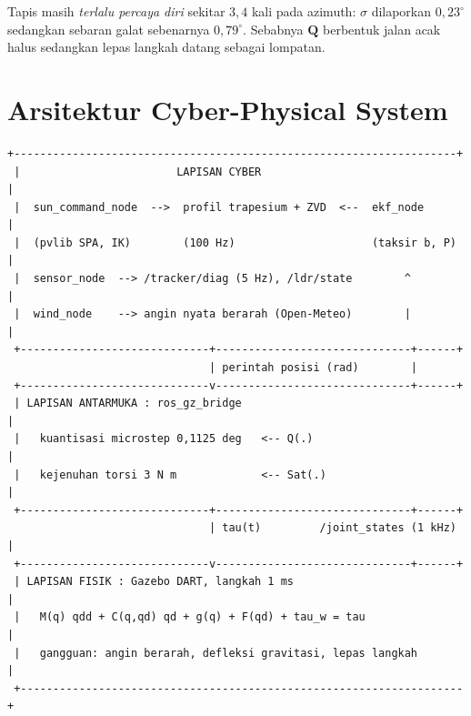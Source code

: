 \documentclass[11pt,a4paper]{article}
\newcommand{\degg}{^\circ}
\begin{document}
Tapis masih \emph{terlalu percaya diri} sekitar $3{,}4$ kali pada azimuth: $\sigma$ dilaporkan $0{,}23\degg$
sedangkan sebaran galat sebenarnya $0{,}79\degg$. Sebabnya $\bm{Q}$ berbentuk jalan acak halus sedangkan
lepas langkah datang sebagai lompatan.

\section{Arsitektur Cyber-Physical System}

\begin{Verbatim}[fontsize=\small,frame=single]
 +--------------------------------------------------------------------+
 |                        LAPISAN CYBER                               |
 |  sun_command_node  -->  profil trapesium + ZVD  <--  ekf_node      |
 |  (pvlib SPA, IK)        (100 Hz)                     (taksir b, P) |
 |  sensor_node  --> /tracker/diag (5 Hz), /ldr/state        ^        |
 |  wind_node    --> angin nyata berarah (Open-Meteo)        |        |
 +-----------------------------+------------------------------+------+
                               | perintah posisi (rad)        |
 +-----------------------------v------------------------------+------+
 | LAPISAN ANTARMUKA : ros_gz_bridge                                  |
 |   kuantisasi microstep 0,1125 deg   <-- Q(.)                       |
 |   kejenuhan torsi 3 N m             <-- Sat(.)                     |
 +-----------------------------+------------------------------+------+
                               | tau(t)         /joint_states (1 kHz) |
 +-----------------------------v------------------------------+------+
 | LAPISAN FISIK : Gazebo DART, langkah 1 ms                          |
 |   M(q) qdd + C(q,qd) qd + g(q) + F(qd) + tau_w = tau               |
 |   gangguan: angin berarah, defleksi gravitasi, lepas langkah       |
 +--------------------------------------------------------------------+
\end{Verbatim}
\end{document}
